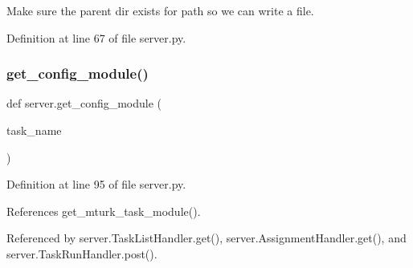 \begin{DoxyVerb}Make sure the parent dir exists for path so we can write a file.\end{DoxyVerb}
 

Definition at line 67 of file server.\+py.

\mbox{\label{namespaceserver_a2467b58afe94f16856770faf20184b7b}} 
\subsubsection{\texorpdfstring{get\+\_\+config\+\_\+module()}{get\_config\_module()}}
{\footnotesize\ttfamily def server.\+get\+\_\+config\+\_\+module (\begin{DoxyParamCaption}\item[{}]{task\+\_\+name }\end{DoxyParamCaption})}



Definition at line 95 of file server.\+py.



References get\+\_\+mturk\+\_\+task\+\_\+module().



Referenced by server.\+Task\+List\+Handler.\+get(), server.\+Assignment\+Handler.\+get(), and server.\+Task\+Run\+Handler.\+post().

